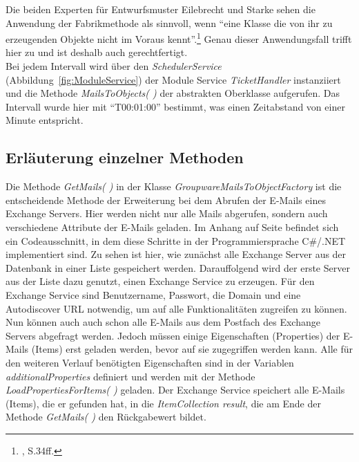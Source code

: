 \noindent
Die beiden Experten für Entwurfsmuster Eilebrecht und Starke sehen die Anwendung der Fabrikmethode als sinnvoll, wenn \enquote{eine Klasse die von ihr zu erzeugenden Objekte nicht im Voraus kennt}.\footnote{\citeauthor{PatternsKompakt} \citeyear{PatternsKompakt}, S.34ff.} Genau dieser Anwendungsfall trifft hier zu und ist deshalb auch gerechtfertigt.\\

\noindent
Bei jedem Intervall wird über den \textit{SchedulerService} (Abbildung~\ref{fig:ModuleService}) der Module Service \textit{TicketHandler} instanziiert und die Methode \textit{MailsToObjects( )} der abstrakten Oberklasse aufgerufen. Das Intervall wurde hier mit \enquote{T00:01:00} bestimmt, was einen Zeitabstand von einer Minute entspricht.




\subsection{Erläuterung einzelner Methoden}
\noindent
Die Methode \textit{GetMails( )} in der Klasse \textit{GroupwareMailsToObjectFactory} ist die entscheidende Methode der Erweiterung bei dem Abrufen der E-Mails eines Exchange Servers. Hier werden nicht nur alle Mails abgerufen, sondern auch verschiedene Attribute der E-Mails geladen. Im Anhang auf Seite \pageref{Codeausschnitt} befindet sich ein Codeausschnitt, in dem diese Schritte in der Programmiersprache C\#/.NET implementiert sind. Zu sehen ist hier, wie zunächst alle Exchange Server aus der Datenbank in einer Liste gespeichert werden. Darauffolgend wird der erste Server aus der Liste dazu genutzt, einen Exchange Service zu erzeugen. Für den Exchange Service sind Benutzername, Passwort, die Domain und eine Autodiscover URL notwendig, um auf alle Funktionalitäten zugreifen zu können. Nun können auch auch schon alle E-Mails aus dem Postfach des Exchange Servers abgefragt werden. Jedoch müssen einige Eigenschaften (Properties) der E-Mails (Items) erst geladen werden, bevor auf sie zugegriffen werden kann. Alle für den weiteren Verlauf benötigten Eigenschaften sind in der Variablen  \textit{additionalProperties} definiert und werden mit der Methode  \textit{LoadPropertiesForItems( )} geladen. Der Exchange Service speichert alle E-Mails (Items), die er gefunden hat, in die  \textit{ItemCollection result}, die am Ende der Methode  \textit{GetMails( )} den Rückgabewert bildet. 

